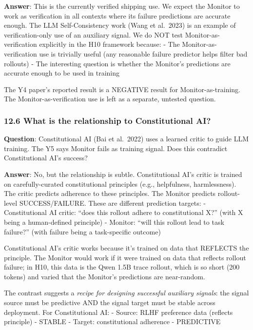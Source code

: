 \documentclass[11pt]{article}
\begin{document}
\textbf{Answer}: This is the currently verified shipping use. We expect
the Monitor to work as verification in all contexts where its failure
predictions are accurate enough. The LLM Self-Consistency work (Wang et
al.~2023) is an example of verification-only use of an auxiliary signal.
We do NOT test Monitor-as-verification explicitly in the H10 framework
because: - The Monitor-as-verification use is trivially useful (any
reasonable failure predictor helps filter bad rollouts) - The
interesting question is whether the Monitor's predictions are accurate
enough to be used in training

The Y4 paper's reported result is a NEGATIVE result for
Monitor-as-training. The Monitor-as-verification use is left as a
separate, untested question.

\subsubsection{12.6 What is the relationship to Constitutional
AI?}\label{what-is-the-relationship-to-constitutional-ai}

\textbf{Question}: Constitutional AI (Bai et al.~2022) uses a learned
critic to guide LLM training. The Y5 says Monitor fails as training
signal. Does this contradict Constitutional AI's success?

\textbf{Answer}: No, but the relationship is subtle. Constitutional AI's
critic is trained on carefully-curated constitutional principles (e.g.,
helpfulness, harmlessness). The critic predicts adherence to these
principles. The Monitor predicts rollout-level SUCCESS/FAILURE. These
are different prediction targets: - Constitutional AI critic: ``does
this rollout adhere to constitutional X?'' (with X being a human-defined
principle) - Monitor: ``will this rollout lead to task failure?'' (with
failure being a task-specific outcome)

Constitutional AI's critic works because it's trained on data that
REFLECTS the principle. The Monitor would work if it were trained on
data that reflects rollout failure; in H10, this data is the Qwen 1.5B
trace rollout, which is so short (200 tokens) and varied that the
Monitor's predictions are near-random.

The contrast suggests a \emph{recipe for designing successful auxiliary
signals}: the signal source must be predictive AND the signal target
must be stable across deployment. For Constitutional AI: - Source: RLHF
preference data (reflects principle) - STABLE - Target: constitutional
adherence - PREDICTIVE
\end{document}
